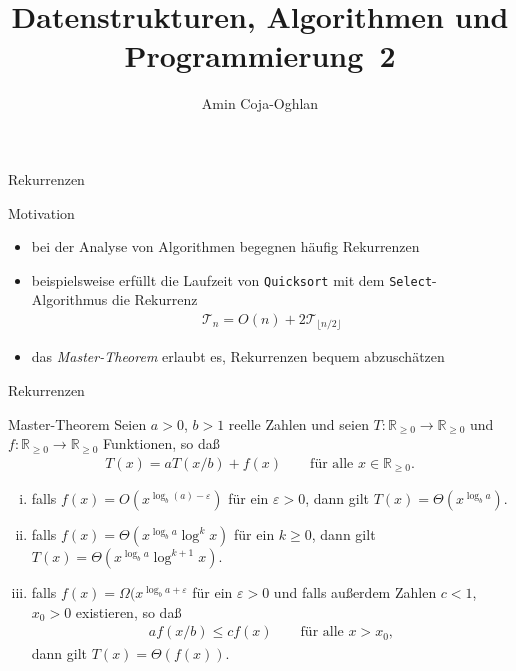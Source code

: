\documentclass[aspectratio=1610, 11pt]{beamer}
\title{Datenstrukturen, Algorithmen und Programmierung~2}
\author[A.~Coja-Oghlan]{Amin Coja-Oghlan}
\institute[DAP2]{Lehrstuhl Informatik 2\\Fakult\"at f\"ur Informatik}
\newcommand\cT{\mathcal T}
\newcommand\RRpos{\mathbb R_{\geq0}}
\newcommand{\eps}{\varepsilon}
\begin{document}
\maketitle

\begin{frame}{Rekurrenzen}
	\begin{exampleblock}{Motivation}
		\begin{itemize}
			\item bei der Analyse von Algorithmen begegnen h\"aufig Rekurrenzen
			\item beispielsweise erf\"ullt die Laufzeit von {\tt Quicksort} mit dem {\tt Select}-Algorithmus die Rekurrenz
				\begin{align*}
					\cT_n=O(n)+2\cT_{\lfloor n/2\rfloor}
				\end{align*}
			\item das {\em Master-Theorem} erlaubt es, Rekurrenzen bequem abzusch\"atzen
		\end{itemize}
	\end{exampleblock}
\end{frame}

\begin{frame}{Rekurrenzen}
	\begin{exampleblock}{Master-Theorem}
	Seien $a>0$, $b>1$ reelle Zahlen und seien $T:\RRpos\to\RRpos$ und $f:\RRpos\to\RRpos$ Funktionen, so da\ss
	\begin{align*}
		T(x)=aT(x/b)+f(x)\qquad\mbox{f\"ur alle }x\in\RRpos.
	\end{align*}
	\vspace{-5mm}
	\begin{enumerate}[(i)]
		\item falls $f(x)=O(x^{\log_b(a)-\eps})$ f\"ur ein $\eps>0$, dann gilt $T(x)=\Theta(x^{\log_ba})$.
		\item falls $f(x)=\Theta(x^{\log_ba}\log^kx)$ f\"ur ein $k\geq0$, dann gilt $T(x)=\Theta(x^{\log_ba}\log^{k+1}x)$.
		\item falls $f(x)=\Omega(x^{\log_ba+\eps}$ f\"ur ein $\eps>0$ und falls au\ss erdem  Zahlen $c<1$, $x_0>0$ existieren, so da\ss
			\begin{align*}
				af(x/b)\leq cf(x)\qquad\mbox{f\"ur alle }x>x_0,
			\end{align*}
			dann gilt $T(x)=\Theta(f(x))$.
	\end{enumerate}
	\end{exampleblock}
\end{frame}
\end{document}
